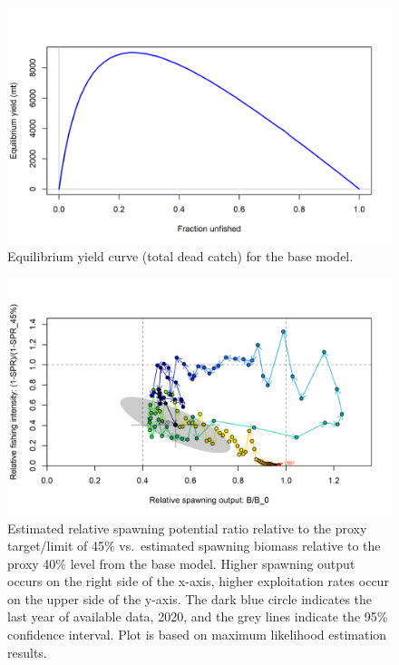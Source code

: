 \documentclass[11pt,
  english,
  a4paper,
]{article}
\begin{document}
\tagmcend\tagstructend


\begin{figure}
\centering
\includegraphics[width=1\textwidth,height=1\textheight]{figs/yield1_yield_curve.png}
\caption{Equilibrium yield curve (total dead catch) for the base model.\label{fig:yield1}}
\end{figure}

\tagmcend\tagstructend


\begin{figure}
\centering
\includegraphics[width=1\textwidth,height=0.9\textheight]{figs/SPR4_phase.png}
\caption{Estimated relative spawning potential ratio relative to the proxy target/limit of 45\% vs.~estimated spawning biomass relative to the proxy 40\% level from the base model. Higher spawning output occurs on the right side of the x-axis, higher exploitation rates occur on the upper side of the y-axis. The dark blue circle indicates the last year of available data, 2020, and the grey lines indicate the 95\% confidence interval. Plot is based on maximum likelihood estimation results.\label{fig:SPR4_phase}}
\end{figure}
\end{document}
